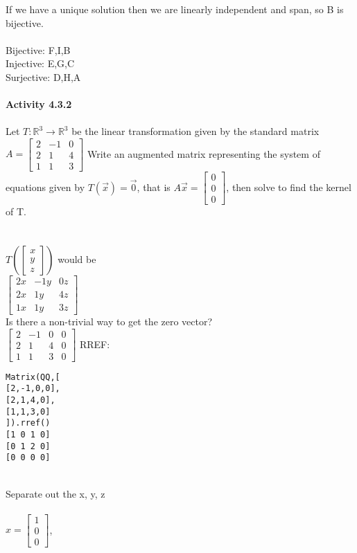 \documentclass{article}
\begin{document}
If we have a unique solution then we are linearly independent and span, so B is bijective.\\
\\
Bijective: F,I,B \\
Injective: E,G,C \\
Surjective: D,H,A \\
\\
\newpage \noindent\textbf{Activity 4.3.2}\\
\\
Let $T: \mathbb{R}^3 \to \mathbb{R}^3$ be the linear transformation given by the standard matrix $A = \begin{bmatrix} 
2 & -1 & 0 \\ 
2 & 1 & 4 \\
1 & 1 & 3 
\end{bmatrix}$ Write an augmented matrix representing the system of equations given by $T(\vec{x}) = \vec{0}$, that is $A\vec{x} = \begin{bmatrix} 0\\0\\0 \end{bmatrix}$, then solve to find the kernel of T.\\
\\
\\
$T\left(\begin{bmatrix} x\\y\\z \end{bmatrix}\right)$ would be\\
$\begin{bmatrix}
2x & -1y & 0z \\ 
2x & 1y & 4z \\
1x & 1y & 3z 
\end{bmatrix}$ \\
Is there a non-trivial way to get the zero vector?\\
$\begin{bmatrix}
2 & -1 & 0 & 0\\ 
2 & 1 & 4 & 0\\
1 & 1 & 3 & 0 
\end{bmatrix}$
RREF:
\begin{verbatim}
Matrix(QQ,[ 
[2,-1,0,0],
[2,1,4,0],
[1,1,3,0]
]).rref()
[1 0 1 0]
[0 1 2 0]
[0 0 0 0]
\end{verbatim}
\\
Separate out the x, y, z\\
\\
$x = \begin{bmatrix} 1 \\ 0 \\ 0 \end{bmatrix}$,
\end{document}
